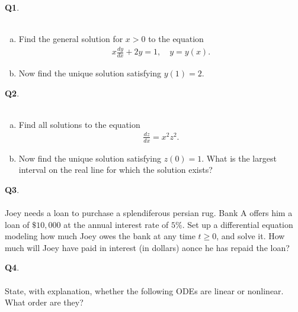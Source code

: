 \documentclass[12pt, oneside]{amsart}
\begin{document}
\vfill


\newpage
\noindent
\textbf{Q1}. \\ \\ 
\begin{enumerate}[a)]
    \item
Find the general solution for $x > 0$ to the equation
\begin{equation*}
\begin{split}
x \frac{dy}{dx} + 2y =1, \quad y=y(x).
\end{split}
\end{equation*}



\vspace{5in}
\item
    Now find the unique solution satisfying $y(1) = 2$.
\end{enumerate}

\newpage
\noindent
\textbf{Q2}. \\ \\ 
\begin{enumerate}[a)]
    \item
Find all solutions to the equation
\begin{equation*}
\begin{split}
\frac{dz}{dx}=x^{2} z^{2}.
\end{split}
\end{equation*}



\vspace{5in}
\item
    Now find the unique solution satisfying $z(0) = 1$. What is the largest interval on the real line for which the solution exists?
\end{enumerate}

\newpage
\noindent
\textbf{Q3}. \\ \\ 
        Joey needs a loan to purchase a splendiferous persian rug. Bank A offers him a loan of $\$10,000$ at the annual interest rate of $5\%$. Set up a differential equation modeling how much Joey owes the bank at any time $t \ge 0$, and solve it. How much will Joey have paid in interest (in dollars) aonce he has repaid the loan?    

        \newpage

\noindent
\textbf{Q4}. \\ \\ 
State, with explanation, whether the following ODEs are linear or nonlinear. What order are they?
\end{document}
